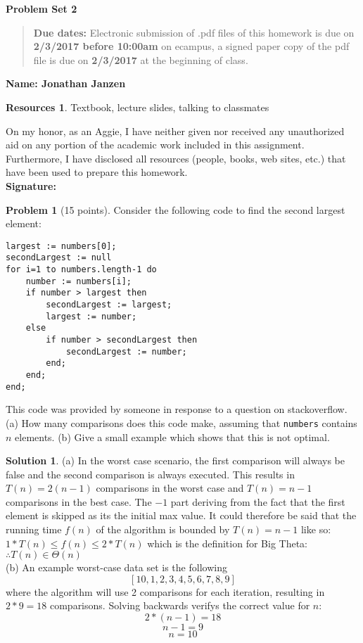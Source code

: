 \documentclass{article}
\theoremstyle{definition}
\newtheorem{problem}{Problem}
\newtheorem*{solution}{Solution}
\newtheorem*{resources}{Resources}
\newcommand{\name}[1]{\noindent\textbf{Name: #1}}
\newcommand{\honor}{\noindent On my honor, as an Aggie, I have neither
  given nor received any unauthorized aid on any portion of the
  academic work included in this assignment. Furthermore, I have
  disclosed all resources (people, books, web sites, etc.) that have
  been used to prepare this homework. \\[1ex]
 \textbf{Signature:} \underline{\hspace*{5cm}} }
\newcommand{\problemset}[1]{\begin{center}\textbf{Problem Set #1}\end{center}}
\newcommand{\duedate}[2]{\begin{quote}\textbf{Due dates:} Electronic submission of .pdf files of this homework is due on \textbf{#1} on ecampus, a signed paper copy
    of the pdf file is due on \textbf{#2} at the beginning of
    class. \end{quote} }
\begin{document}
\problemset{2}
\duedate{2/3/2017 before 10:00am}{2/3/2017}
\name{Jonathan Janzen}
\begin{resources} Textbook, lecture slides, talking to classmates
\end{resources}
\honor

\newpage


\begin{problem}[15 points]
Consider the following code to find the second largest element: 
\begin{verbatim}
largest := numbers[0];
secondLargest := null
for i=1 to numbers.length-1 do
    number := numbers[i];
    if number > largest then
        secondLargest := largest;
        largest := number;
    else
        if number > secondLargest then
            secondLargest := number;
        end;
    end;
end;
\end{verbatim}
This code was provided by someone in response to a question on
stackoverflow. (a) How many comparisons does this code make, assuming
that \verb|numbers| contains $n$ elements. (b) Give a small example
which shows that this is not optimal.
\end{problem}
\begin{solution}
(a) In the worst case scenario, the first comparison will always be false and the second comparison is always executed. This results in $T(n) = 2(n-1)$ comparisons in the worst case and $T(n) = n-1$ comparisons in the best case. The $-1$ part deriving from the fact that the first element is skipped as its the initial max value. It could therefore be said that the running time $f(n)$ of the algorithm is bounded by $T(n) = n-1$ like so: $1*T(n) \leq f(n) \leq 2*T(n)$ which is the definition for Big Theta: $\therefore T(n) \in \Theta(n)$\\
(b) An example worst-case data set is the following
$$ [10,1,2,3,4,5,6,7,8,9] $$
where the algorithm will use 2 comparisons for each iteration, resulting in $2*9 = 18$ comparisons. Solving backwards verifys the correct value for $n$:\\
$$2*(n-1) = 18$$
$$n-1 = 9$$
$$n = 10$$
\end{solution}
\end{document}

